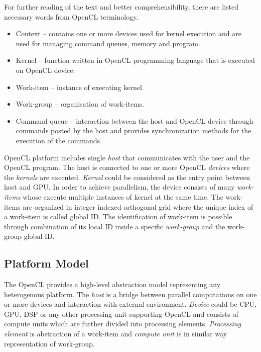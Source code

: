 For further reading of the text and better comprehensibility, there are
listed necessary words from OpenCL terminology\cite{opencl}.
\begin{itemize}
\item Context -- contains one or more devices used for kernel execution
and are used for managing command queues, memory and program.
\item Kernel -- function written in OpenCL programming language that 
is executed on OpenCL device. 
\item Work-item -- instance of executing kernel. 
\item Work-group -- organisation of work-items. 
\item Command-queue -- interaction between the host and OpenCL
device through commands posted by the host and provides synchronization
methods for the execution of the commands.
\end{itemize}

OpenCL platform includes single \textit{host} that communicates with the user
and the OpenCL program. The host is connected to one or more
OpenCL \textit{devices} where the \textit{kernels} are executed. 
\textit{Kernel} could be considered as the entry point between host and
GPU. In order to achieve parallelism, the device consists of many 
\textit{work-items} whose execute multiple instances of kernel at the same 
time. The work-items are organized in integer indexed orthogonal grid where 
the unique index of a work-item is called global ID. The identification
of work-item is possible through combination of its local ID inside a specific
\textit{work-group} and the work-group global ID.

\subsection{Platform Model}
The OpenCL provides a high-level abstraction model representing any heterogenous
platform. The \textit{host} is a bridge between parallel computations on one or
more devices and interaction with external environment. \textit{Device} could be
CPU, GPU, DSP or any other processing unit supporting OpenCL and consists
of compute units which are further divided into processing elements. 
\textit{Processing element} is abstraction of a work-item and 
\textit{compute unit} is in similar way representation of work-group.

